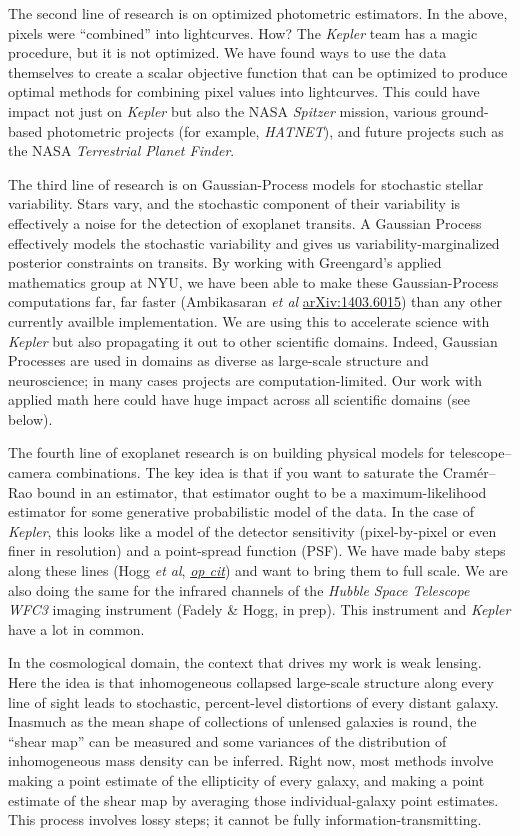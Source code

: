 \documentclass[11pt, letterpaper]{article}
\newcommand{\arxiv}[1]{\href{http://arxiv.org/abs/#1}{arXiv:#1}}
\newcommand{\opcit}[1]{\href{http://arxiv.org/abs/#1}{\textit{op cit}}}
\begin{document}
The second line of research is on optimized photometric estimators.
In the above, pixels were ``combined'' into lightcurves.
How?
The \textsl{Kepler} team has a magic procedure, but it is not optimized.
We have found ways to use the data themselves to create a scalar
objective function that can be optimized to produce optimal
methods for combining pixel values into lightcurves.
This could have impact not just on \textsl{Kepler} but also the NASA
\textsl{Spitzer} mission, various ground-based photometric projects
(for example, \textsl{HATNET}), and future projects such as the NASA
\textsl{Terrestrial Planet Finder}.

The third line of research is on Gaussian-Process models for
stochastic stellar variability.
Stars vary, and the stochastic component of their variability is
effectively a noise for the detection of exoplanet transits.
A Gaussian Process effectively models the stochastic variability and
gives us variability-marginalized posterior constraints on transits.
By working with Greengard's applied mathematics group at NYU, we have
been able to make these Gaussian-Process computations far, far faster
(Ambikasaran \textit{et al} \arxiv{1403.6015})
than any other currently availble implementation.
We are using this to accelerate science with \textsl{Kepler} but also
propagating it out to other scientific domains.
Indeed, Gaussian Processes are used in domains as diverse as
large-scale structure and neuroscience; in many cases projects are
computation-limited.
Our work with applied math here could have huge impact across all
scientific domains (see below).

The fourth line of exoplanet research is on building physical models for
telescope--camera combinations.
The key idea is that if you want to saturate the Cram\'er--Rao bound
in an estimator, that estimator ought to be a maximum-likelihood
estimator for some generative probabilistic model of the data.
In the case of \textsl{Kepler}, this looks like a model of the
detector sensitivity (pixel-by-pixel or even finer in resolution) and
a point-spread function (PSF).  
We have made baby steps along these lines
(Hogg \textit{et al}, \opcit{1403.6015})
and want to bring them to full scale.
We are also doing the same for the infrared channels of the
\textsl{Hubble Space Telescope} \textsl{WFC3} imaging instrument
(Fadely \& Hogg, in prep).
This instrument and \textsl{Kepler} have a lot in common.

In the cosmological domain, the context that drives my work is weak
lensing.
Here the idea is that inhomogeneous collapsed large-scale structure
along every line of sight leads to stochastic, percent-level
distortions of every distant galaxy.
Inasmuch as the mean shape of collections of unlensed galaxies is
round, the ``shear map'' can be measured and some variances of the
distribution of inhomogeneous mass density can be inferred.
Right now, most methods involve making a point estimate of the
ellipticity of every galaxy, and making a point estimate of the shear
map by averaging those individual-galaxy point estimates.
This process involves lossy steps; it cannot be fully
information-transmitting.
\end{document}
